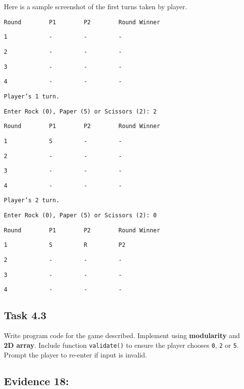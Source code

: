 Here is a sample screenshot of the first turns taken by player. 

\noindent\begin{minipage}[t]{1\columnwidth}%
\texttt{Round ~~~~~~~P1 ~~~~~~~P2 ~~~~~~~Round
Winner}

\texttt{1 ~~~~~~~~~~~- ~~~~~~~~- ~~~~~~~~- }

\texttt{2 ~~~~~~~~~~~- ~~~~~~~~- ~~~~~~~~- }

\texttt{3 ~~~~~~~~~~~- ~~~~~~~~- ~~~~~~~~- }

\texttt{4 ~~~~~~~~~~~- ~~~~~~~~- ~~~~~~~~- }

\texttt{Player's 1 turn.}

\texttt{Enter Rock (0), Paper (5) or Scissors (2): 2}

\texttt{Round ~~~~~~~P1 ~~~~~~~P2 ~~~~~~~Round
Winner}

\texttt{1 ~~~~~~~~~~~S ~~~~~~~~- ~~~~~~~~- }

\texttt{2 ~~~~~~~~~~~- ~~~~~~~~- ~~~~~~~~- }

\texttt{3 ~~~~~~~~~~~- ~~~~~~~~- ~~~~~~~~- }

\texttt{4 ~~~~~~~~~~~- ~~~~~~~~- ~~~~~~~~- }

\texttt{Player's 2 turn.}

\texttt{Enter Rock (0), Paper (5) or Scissors (2): 0}

\texttt{Round ~~~~~~~P1 ~~~~~~~P2 ~~~~~~~Round
Winner}

\texttt{1 ~~~~~~~~~~~S ~~~~~~~~R ~~~~~~~~P2 }

\texttt{2 ~~~~~~~~~~~- ~~~~~~~~- ~~~~~~~~- }

\texttt{3 ~~~~~~~~~~~- ~~~~~~~~- ~~~~~~~~- }

\texttt{4 ~~~~~~~~~~~- ~~~~~~~~- ~~~~~~~~- }%
\end{minipage}

\subsection*{Task 4.3 }

Write program code for the game described. Implement using \textbf{modularity}
and\textbf{ 2D array}. Include function \texttt{validate()} to ensure
the player chooses \texttt{0}, \texttt{2} or \texttt{5}. Prompt the
player to re-enter if input is invalid. 

\subsection*{Evidence 18: }

